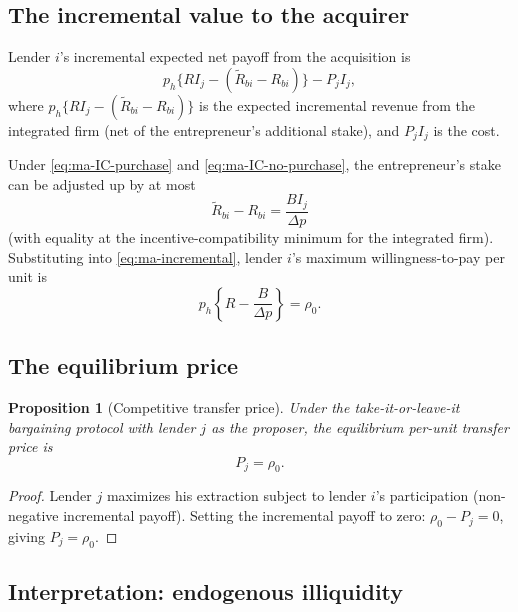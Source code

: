 \documentclass[11pt,a4paper,oneside]{book}
\theoremstyle{plain}
\newtheorem{proposition}[theorem]{Proposition}
\theoremstyle{definition}
\theoremstyle{remark}
\numberwithin{equation}{chapter}
\begin{document}
\subsection{The incremental value to the acquirer}

Lender $i$'s incremental expected net payoff from the acquisition is
\begin{equation}\label{eq:ma-incremental}
  p_h \bigl\{ R I_j - (\widetilde{R}_{b i} - R_{b i}) \bigr\} - P_j I_j,
\end{equation}
where $p_h \{R I_j - (\widetilde{R}_{b i} - R_{b i})\}$ is the expected incremental revenue from the integrated firm (net of the entrepreneur's additional stake), and $P_j I_j$ is the cost.

Under \eqref{eq:ma-IC-purchase} and \eqref{eq:ma-IC-no-purchase}, the entrepreneur's stake can be adjusted up by at most
\begin{equation*}
  \widetilde{R}_{b i} - R_{b i} = \frac{B I_j}{\Delta p}
\end{equation*}
(with equality at the incentive-compatibility minimum for the integrated firm).
Substituting into \eqref{eq:ma-incremental}, lender $i$'s maximum willingness-to-pay per unit is
\begin{equation*}
  p_h \left\{ R - \frac{B}{\Delta p} \right\} = \rho_0.
\end{equation*}

\subsection{The equilibrium price}

\begin{proposition}[Competitive transfer price]\label{prop:ma-transfer}
Under the take-it-or-leave-it bargaining protocol with lender $j$ as the proposer, the equilibrium per-unit transfer price is
\begin{equation}\label{eq:ma-price}
  P_j = \rho_0.
\end{equation}
\end{proposition}

\begin{proof}
Lender $j$ maximizes his extraction subject to lender $i$'s participation (non-negative incremental payoff).
Setting the incremental payoff to zero: $\rho_0 - P_j = 0$, giving $P_j = \rho_0$.
\end{proof}

\subsection{Interpretation: endogenous illiquidity}
\end{document}
